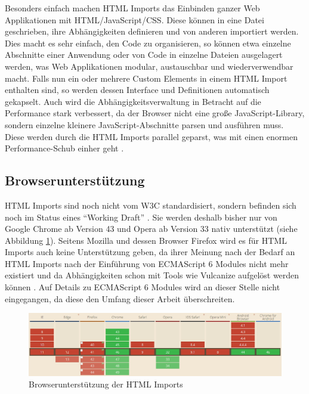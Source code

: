 Besonders einfach machen \ac{HTML} Imports das Einbinden ganzer Web Applikationen mit \ac{HTML}/JavaScript/\ac{CSS}. Diese können in eine Datei geschrieben, ihre Abhängigkeiten definieren und von anderen importiert werden. Dies macht es sehr einfach, den Code zu organisieren, so können etwa einzelne Abschnitte einer Anwendung oder von Code in einzelne Dateien ausgelagert werden, was Web Applikationen modular, austauschbar und wiederverwendbar macht. Falls nun ein oder mehrere Custom Elements in einem \ac{HTML} Import enthalten sind, so werden dessen Interface und Definitionen automatisch gekapselt. Auch wird die Abhängigkeitsverwaltung in Betracht auf die Performance stark verbessert, da der Browser nicht eine große JavaScript-Library, sondern einzelne kleinere JavaScript-Abschnitte parsen und ausführen muss. Diese werden durch die \ac{HTML} Imports parallel geparst, was mit einen enormen Performance-Schub einher geht \cite{citeulike:13853647}.


\subsection{Browserunterstützung}\label{browserunterstuxfctzung}

\ac{HTML} Imports sind noch nicht vom \ac{W3C} standardisiert, sondern befinden sich noch im Status eines ``Working Draft'' \cite{citeulike:13853711}. Sie werden deshalb bisher nur von Google Chrome ab Version 43 und Opera ab Version 33 nativ unterstützt (siehe Abbildung \ref{fig:bdhtmli}). Seitens Mozilla und dessen Browser Firefox wird es für \ac{HTML} Imports auch keine Unterstützung geben, da ihrer Meinung nach der Bedarf an \ac{HTML} Imports nach der Einführung von ECMAScript 6 Modules nicht mehr existiert und da Abhängigkeiten schon mit Tools wie Vulcanize aufgelöst werden können \cite{citeulike:13881144}. Auf Details zu ECMAScript 6 Modules wird an dieser Stelle nicht eingegangen, da diese den Umfang dieser Arbeit überschreiten.

\begin{figure}[htbp]
 \centering
 \includegraphics[width=\linewidth]{kapitel2/bilder/5-html-imports-browserunterstuetzung}
 \caption{Browserunterstützung der HTML Imports}
 \label{fig:bdhtmli}
\end{figure}

